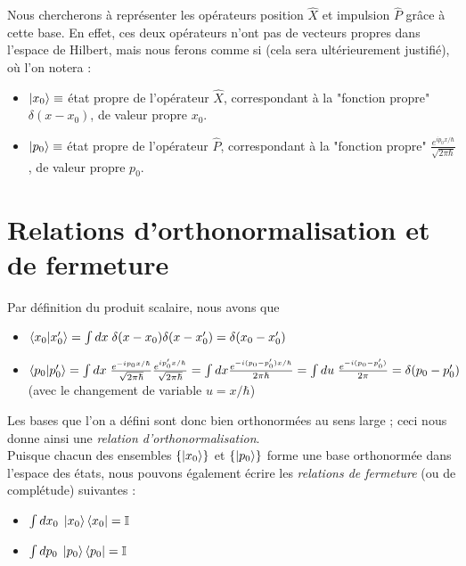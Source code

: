 \documentclass[../notesdecours]{subfiles}
\begin{document}
Nous chercherons à représenter les opérateurs position $\hat{X}$ et impulsion $\hat{P}$ grâce à cette base. En effet, ces deux opérateurs n'ont pas de vecteurs propres dans l'espace de Hilbert, mais nous ferons comme si (cela sera ultérieurement justifié), où l'on notera : 
\begin{itemize}[label = \textbullet]
    \item $\ket{x_0} \equiv$ état propre de l'opérateur $\hat{X}$, correspondant à la "fonction propre" $\delta(x-x_0)$, de valeur propre $x_0$. 
    \item $\ket{p_0} \equiv$ état propre de l'opérateur $\hat{P}$, correspondant à la "fonction propre" $\frac{e^{ip_0 x/\hbar}}{\sqrt{2 \pi \hbar}}$, de valeur propre $p_0$. 
\end{itemize}

\section{Relations d'orthonormalisation et de fermeture}

Par définition du produit scalaire, nous avons que 
\begin{itemize}[label=\textbullet]
    \item $\braket{x_0|x_0'} = \int dx \; \delta (x-x_0) \delta (x-x_0') = \delta (x_0 - x_0')$
    \item $\braket{p_0|p_0'} = \int dx \; \frac{e^{-ip_0 x/\hbar}}{\sqrt{2\pi\hbar}} \frac{e^{ip_0'x/\hbar}}{\sqrt{2\pi\hbar}} = \int dx \frac{e^{-i (p_0 - p_0')x/\hbar}}{2\pi \hbar}	= \int du \; \frac{e^{-i(p_0 - p_0')}}{2\pi} = \delta (p_0-p_0')$ (avec le changement de variable $u = x/\hbar$) \\
\end{itemize}

Les bases que l'on a défini sont donc bien orthonormées au sens large ; ceci nous donne ainsi une \textit{relation d'orthonormalisation}. \\

Puisque chacun des ensembles $\left\{ \ket{x_0} \right\}$ et $\left\{ \ket{p_0} \right\}$ forme une base orthonormée dans l'espace des états, nous pouvons également écrire les \textit{relations de fermeture} (ou de complétude) suivantes : 
\begin{itemize}[label=\textbullet]
    \item $\int dx_0 \; \ket{x_0}\bra{x_0} = \mathbb{I}$ 
    \item $\int dp_0 \; \ket{p_0}\bra{p_0} = \mathbb{I}$ 
\end{itemize}
\end{document}

